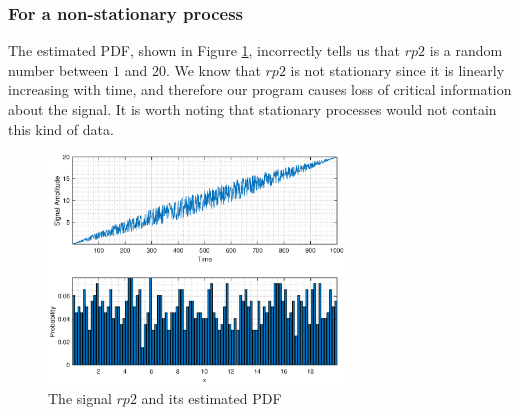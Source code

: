 \documentclass{article}
\begin{document}
\subsubsection{For a non-stationary process}

The estimated PDF, shown in Figure \ref{fig:pdf_nonstat}, incorrectly tells us that $rp2$ is a random number between $1$ and $20$. We know that $rp2$ is not stationary since it is linearly increasing with time, and therefore our program causes loss of critical information about the signal. It is worth noting that stationary processes would not contain this kind of data.

\begin{figure}[h!]
\centering
\includegraphics[width=0.7\textwidth]{pdf_nonstat}
\caption{\label{fig:pdf_nonstat} The signal $rp2$ and its estimated PDF}
\end{figure}
\end{document}
